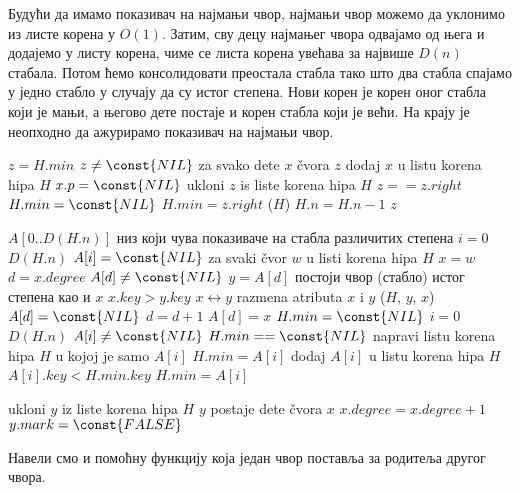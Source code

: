 \documentclass[11pt, a4paper]{article}
\theoremstyle{remark}
\numberwithin{equation}{section}
\begin{document}
	\noindent Будући да имамо показивач на најмањи чвор, најмањи чвор можемо да уклонимо из листе корена у $O(1)$. Затим, сву децу најмањег чвора одвајамо од њега и додајемо у листу корена, чиме се листа корена увећава за највише $D(n)$ стабала. Потом ћемо консолидовати преостала стабла тако што два стабла спајамо у једно стабло у случају да су истог степена. Нови корен је корен оног стабла који је мањи, а његово дете постаје и корен стабла који је већи. На крају је неопходно да ажурирамо показивач на најмањи чвор.
	
	\begin{codebox}
		\li $z=H.min$
		\li \If $z \neq \const{NIL}$
		\li \Do \For za svako dete $x$ čvora $z$
		\li \Do dodaj $x$ u listu korena hipa $H$
		\li $x.p=\const{NIL}$
		\End
		\li ukloni $z$ is liste korena hipa $H$
		\li \If $z==z.right$
		\li \Do $H.min=\const{NIL}$
		\li \Else $H.min=z.right$
		\li \Do {}($H$)
		\End \End
		\li $H.n=H.n-1$
		\End
		\li \Return $z$
	\end{codebox}

	\begin{codebox}
		\Procname{\proc{Consolidate}($H$)}
		\li $A[0..D(H.n)]$ \Comment {}низ који чува показиваче на стабла различитих степена
		\li \For $i=0$ \To $D(H.n)$
		\li \Do $A[i]=\const{NIL}$
		\End
		\li \For za svaki čvor $w$ u listi korena hipa $H$
		\li \Do $x=w$
		\li $d=x.degree$
		\li \While $A[d] \neq \const{NIL}$
		\li \Do $y=A[d]$ \Comment {} постоји чвор (стабло) истог степена као и $x$
		\li \If $x.key > y.key$
		\li \Do $x \leftrightarrow y$ \Comment razmena atributa $x$ i $y$
		\End
		\li {}($H$, $y$, $x$)
		\li $A[d]=\const{NIL}$
		\li $d=d+1$
		\End
		\li $A[d]=x$
		\End
		\li $H.min=\const{NIL}$
		\li \For $i=0$ \To $D(H.n)$
		\li \Do \If $A[i] \neq \const{NIL}$
		\li \Do \If $H.min==\const{NIL}$
		\li \Do napravi listu korena hipa $H$ u kojoj je samo $A[i]$
		\li $H.min=A[i]$
		\li \Else dodaj $A[i]$ u listu korena hipa $H$
		\li \If $A[i].key<H.min.key$
		\li \Do $H.min=A[i]$
	\end{codebox}

	\begin{codebox}
		\Procname{\proc{Fib-Heap-Link}($H$, $y$, $x$)}
		\li ukloni $y$ iz liste korena hipa $H$
		\li $y$ postaje dete čvora $x$
		\li $x.degree=x.degree+1$
		\li $y.mark=\const{FALSE}$
	\end{codebox}

	\noindent Навели смо и помоћну функцију  која један чвор поставља за родитеља другог чвора. \\
	
\end{document}
